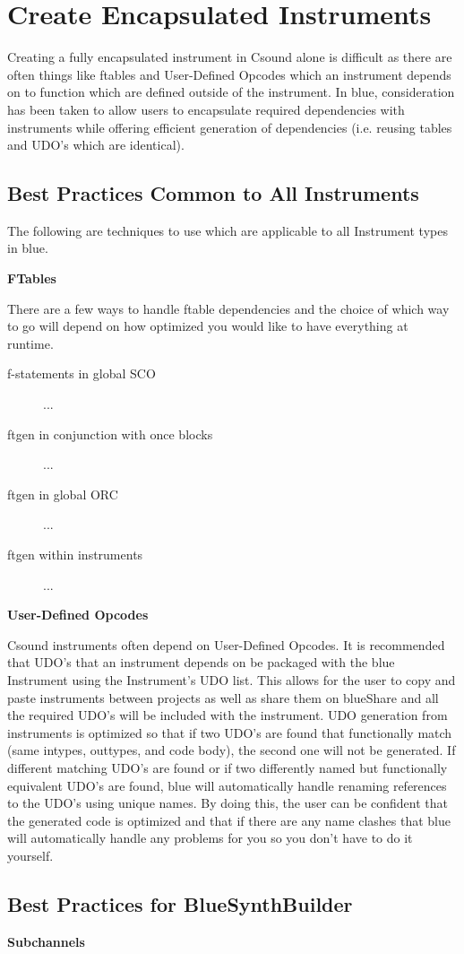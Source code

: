 \section{Create Encapsulated
Instruments}\label{createEncapsulatedInstrument}

Creating a fully encapsulated instrument in Csound alone is difficult as
there are often things like ftables and User-Defined Opcodes which an
instrument depends on to function which are defined outside of the
instrument. In blue, consideration has been taken to allow users to
encapsulate required dependencies with instruments while offering
efficient generation of dependencies (i.e. reusing tables and UDO's
which are identical).

\subsection{Best Practices Common to All Instruments}

The following are techniques to use which are applicable to all
Instrument types in blue.

\textbf{FTables}

There are a few ways to handle ftable dependencies and the choice of
which way to go will depend on how optimized you would like to have
everything at runtime.

\begin{description}
\item[f-statements in global SCO]
...
\item[ftgen in conjunction with once blocks]
...
\item[ftgen in global ORC]
...
\item[ftgen within instruments]
...
\end{description}

\textbf{User-Defined Opcodes}

Csound instruments often depend on User-Defined Opcodes. It is
recommended that UDO's that an instrument depends on be packaged with
the blue Instrument using the Instrument's UDO list. This allows for the
user to copy and paste instruments between projects as well as share
them on blueShare and all the required UDO's will be included with the
instrument. UDO generation from instruments is optimized so that if two
UDO's are found that functionally match (same intypes, outtypes, and
code body), the second one will not be generated. If different matching
UDO's are found or if two differently named but functionally equivalent
UDO's are found, blue will automatically handle renaming references to
the UDO's using unique names. By doing this, the user can be confident
that the generated code is optimized and that if there are any name
clashes that blue will automatically handle any problems for you so you
don't have to do it yourself.

\subsection{Best Practices for BlueSynthBuilder}

\textbf{Subchannels}
